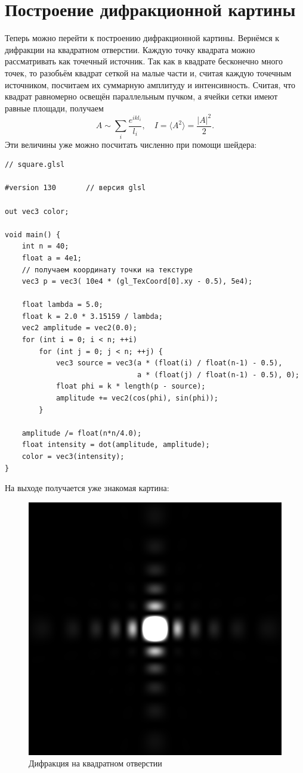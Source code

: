 \documentclass{ncc}
\begin{document}
\section{Построение дифракционной картины}
Теперь можно перейти к построению дифракционной картины. Вернёмся к дифракции на квадратном отверстии. Каждую точку квадрата можно рассматривать как точечный источник. Так как в квадрате бесконечно много точек, то разобьём квадрат сеткой на малые части и, считая каждую точечным источником, посчитаем их суммарную амплитуду и интенсивность. Считая, что квадрат равномерно освещён параллельным пучком, а ячейки сетки имеют равные площади, получаем
\[
    A \sim \sum\limits_i \frac{e^{ikl_i}}{l_i},\quad I = \langle A^2 \rangle = \frac{|A|^2}{2}.
\]
Эти величины уже можно посчитать численно при помощи шейдера:
\begin{lstlisting}
// square.glsl

#version 130       // версия glsl

out vec3 color;

void main() {
    int n = 40;
    float a = 4e1;
    // получаем координату точки на текстуре
    vec3 p = vec3( 10e4 * (gl_TexCoord[0].xy - 0.5), 5e4);

    float lambda = 5.0;
    float k = 2.0 * 3.15159 / lambda;
    vec2 amplitude = vec2(0.0);
    for (int i = 0; i < n; ++i)
        for (int j = 0; j < n; ++j) {
            vec3 source = vec3(a * (float(i) / float(n-1) - 0.5),
                               a * (float(j) / float(n-1) - 0.5), 0);
            float phi = k * length(p - source);
            amplitude += vec2(cos(phi), sin(phi));
        }

    amplitude /= float(n*n/4.0);
    float intensity = dot(amplitude, amplitude);
    color = vec3(intensity);
}

\end{lstlisting}
На выходе получается уже знакомая картина:
\begin{figure}[h]
\center
\includegraphics[width=.3\textwidth]{2015-10-12-difraction-square.png}
\caption{Дифракция на квадратном отверстии}
\end{figure}
\end{document}
